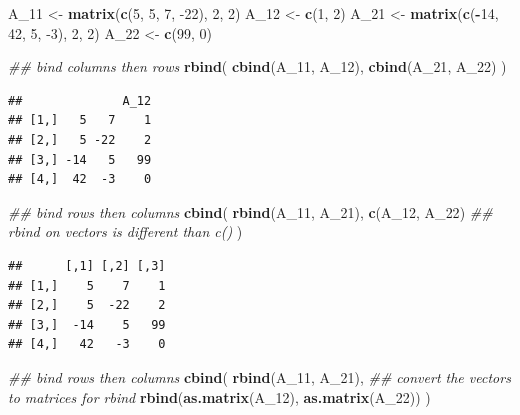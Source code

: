 \documentclass[
]{book}
\newenvironment{Shaded}{\begin{snugshade}}{\end{snugshade}}
\newcommand{\CommentTok}[1]{\textcolor[rgb]{0.56,0.35,0.01}{\textit{#1}}}
\newcommand{\DecValTok}[1]{\textcolor[rgb]{0.00,0.00,0.81}{#1}}
\newcommand{\KeywordTok}[1]{\textcolor[rgb]{0.13,0.29,0.53}{\textbf{#1}}}
\newcommand{\NormalTok}[1]{#1}
\newcommand{\OperatorTok}[1]{\textcolor[rgb]{0.81,0.36,0.00}{\textbf{#1}}}
\newcommand{\StringTok}[1]{\textcolor[rgb]{0.31,0.60,0.02}{#1}}
\theoremstyle{definition}
\theoremstyle{definition}
\theoremstyle{definition}
\theoremstyle{definition}
\theoremstyle{remark}
\begin{document}
\begin{Shaded}
\begin{Highlighting}[]
\NormalTok{A_}\DecValTok{11}\NormalTok{ <-}\StringTok{ }\KeywordTok{matrix}\NormalTok{(}\KeywordTok{c}\NormalTok{(}\DecValTok{5}\NormalTok{, }\DecValTok{5}\NormalTok{, }\DecValTok{7}\NormalTok{, }\DecValTok{-22}\NormalTok{), }\DecValTok{2}\NormalTok{, }\DecValTok{2}\NormalTok{)}
\NormalTok{A_}\DecValTok{12}\NormalTok{ <-}\StringTok{ }\KeywordTok{c}\NormalTok{(}\DecValTok{1}\NormalTok{, }\DecValTok{2}\NormalTok{)}
\NormalTok{A_}\DecValTok{21}\NormalTok{ <-}\StringTok{ }\KeywordTok{matrix}\NormalTok{(}\KeywordTok{c}\NormalTok{(}\OperatorTok{-}\DecValTok{14}\NormalTok{, }\DecValTok{42}\NormalTok{, }\DecValTok{5}\NormalTok{, }\DecValTok{-3}\NormalTok{), }\DecValTok{2}\NormalTok{, }\DecValTok{2}\NormalTok{)}
\NormalTok{A_}\DecValTok{22}\NormalTok{ <-}\StringTok{ }\KeywordTok{c}\NormalTok{(}\DecValTok{99}\NormalTok{, }\DecValTok{0}\NormalTok{)}

\CommentTok{## bind columns then rows}
\KeywordTok{rbind}\NormalTok{(}
    \KeywordTok{cbind}\NormalTok{(A_}\DecValTok{11}\NormalTok{, A_}\DecValTok{12}\NormalTok{),}
    \KeywordTok{cbind}\NormalTok{(A_}\DecValTok{21}\NormalTok{, A_}\DecValTok{22}\NormalTok{)}
\NormalTok{)}
\end{Highlighting}
\end{Shaded}

\begin{verbatim}
##              A_12
## [1,]   5   7    1
## [2,]   5 -22    2
## [3,] -14   5   99
## [4,]  42  -3    0
\end{verbatim}

\begin{Shaded}
\begin{Highlighting}[]
\CommentTok{## bind rows then columns}
\KeywordTok{cbind}\NormalTok{(}
    \KeywordTok{rbind}\NormalTok{(A_}\DecValTok{11}\NormalTok{, A_}\DecValTok{21}\NormalTok{),}
    \KeywordTok{c}\NormalTok{(A_}\DecValTok{12}\NormalTok{, A_}\DecValTok{22}\NormalTok{) }\CommentTok{## rbind on vectors is different than c()}
\NormalTok{)}
\end{Highlighting}
\end{Shaded}

\begin{verbatim}
##      [,1] [,2] [,3]
## [1,]    5    7    1
## [2,]    5  -22    2
## [3,]  -14    5   99
## [4,]   42   -3    0
\end{verbatim}

\begin{Shaded}
\begin{Highlighting}[]
\CommentTok{## bind rows then columns}
\KeywordTok{cbind}\NormalTok{(}
    \KeywordTok{rbind}\NormalTok{(A_}\DecValTok{11}\NormalTok{, A_}\DecValTok{21}\NormalTok{),}
    \CommentTok{## convert the vectors to matrices for rbind}
    \KeywordTok{rbind}\NormalTok{(}\KeywordTok{as.matrix}\NormalTok{(A_}\DecValTok{12}\NormalTok{), }\KeywordTok{as.matrix}\NormalTok{(A_}\DecValTok{22}\NormalTok{))}
\NormalTok{)}
\end{Highlighting}
\end{Shaded}
\end{document}
